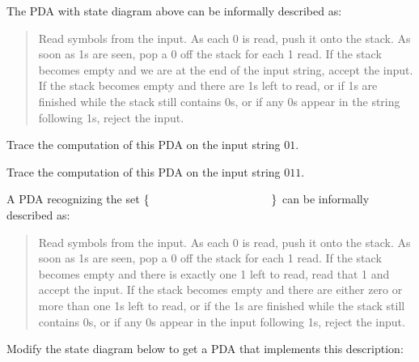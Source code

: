 \documentclass[12pt, oneside]{article}
\begin{document}
The PDA with state diagram above can be informally described as:
\begin{quote}
    Read symbols from the input. As each 0 is read, push it onto the stack. 
    As soon as 1s are seen, pop a 0 off the stack for each 1 read. 
    If the stack becomes empty and we are at the end of the input string, accept the input. 
    If the stack becomes empty and there are 1s left to read, 
    or if 1s are finished while the stack still contains 0s, or if any 0s
    appear in the string following 1s, 
    reject the input.
\end{quote}
    

Trace the computation of this PDA on the input string $01$.

\vfill
    
Trace the computation of this PDA on the input string $011$.

\vfill

\newpage
A PDA recognizing the set $\{ \hspace{1.5 in} \}$ can be informally described as:
\begin{quote}
    Read symbols from the input. As each 0 is read, push it onto the stack. 
    As soon as 1s are seen, pop a 0 off the stack for each 1 read. 
    If the stack becomes empty and there is exactly one 1 left to read, read that 1 and accept the input. 
    If the stack becomes empty and there are either zero or more than one 1s left to read, 
    or if the 1s are finished while the stack still contains 0s, or if any 0s appear in the input following 1s, 
    reject the input.
\end{quote}
Modify the state diagram below to get a PDA that implements this description:

    
\end{document}
